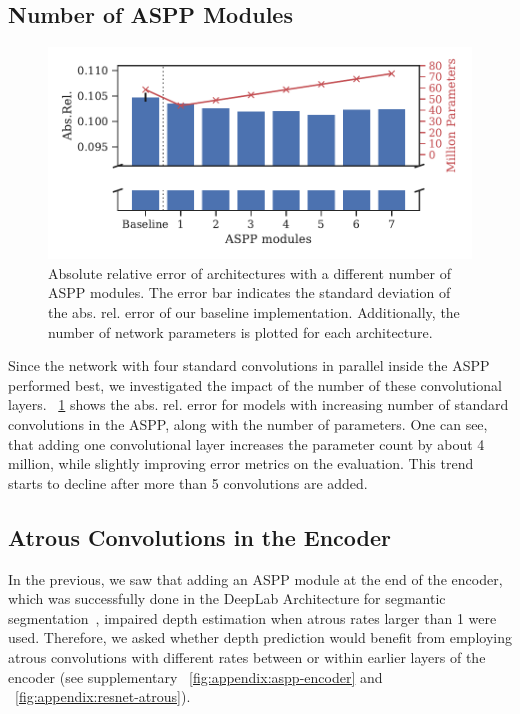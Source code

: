 \subsection{Number of ASPP Modules}
\label{section:experiments:num-aspp-modules}
\begin{figure}[t]
    \begin{center}
       \includegraphics[width=1.0\linewidth]{images/figures/experiment2_AbsRel.pdf}
    \end{center}
   \caption{Absolute relative error of architectures with a different number of ASPP modules. The error bar indicates the standard deviation of the abs. rel. error of our baseline implementation. Additionally, the number of network parameters is plotted for each architecture.}
\label{fig:long}
\end{figure}
Since the network with four standard convolutions in parallel inside the ASPP performed best, we investigated the impact of the number of these convolutional layers.
\figurename~\ref{fig:long} shows the abs. rel. error for models with increasing number of standard convolutions in the ASPP, along with the number of parameters.
One can see, that adding one convolutional layer increases the parameter count by about 4 million, while slightly improving error metrics on the evaluation. This trend starts to decline after more than 5 convolutions are added. 

\subsection{Atrous Convolutions in the Encoder}\label{section:experiments:atrous-encoder}
In the previous, we saw that adding an ASPP module at the end of the encoder, which was successfully done in the DeepLab Architecture for segmantic segmentation~\cite{chen2018deeplab, chen2018encoder}, impaired depth estimation when atrous rates larger than 1 were used.
Therefore, we asked whether depth prediction would benefit from employing atrous convolutions with different rates between or within earlier layers of the encoder (see supplementary \figurename~\ref{fig:appendix:aspp-encoder} and \figurename~\ref{fig:appendix:resnet-atrous}). 

